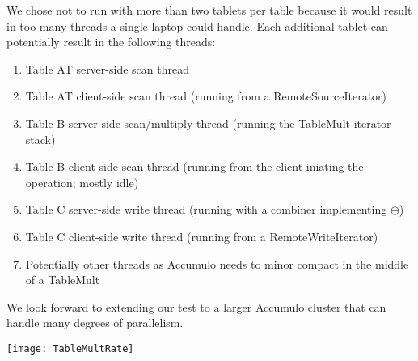 We chose not to run with more than two tablets per table because it would result in too many threads 
a single laptop could handle.  Each additional tablet can potentially result in the following threads:
\begin{enumerate}
\item Table AT server-side scan thread
\item Table AT client-side scan thread (running from a RemoteSourceIterator)
\item Table B server-side scan/multiply thread (running the TableMult iterator stack)
\item Table B client-side scan thread (running from the client iniating the operation; mostly idle)
\item Table C server-side write thread (running with a combiner implementing $\oplus$)
\item Table C client-side write thread (running from a RemoteWriteIterator)
\item Potentially other threads as Accumulo needs to minor compact in the middle of a TableMult
\end{enumerate}
We look forward to extending our test to a larger Accumulo cluster that can handle many degrees of parallelism.


\texttt{[image: TableMultRate]}


